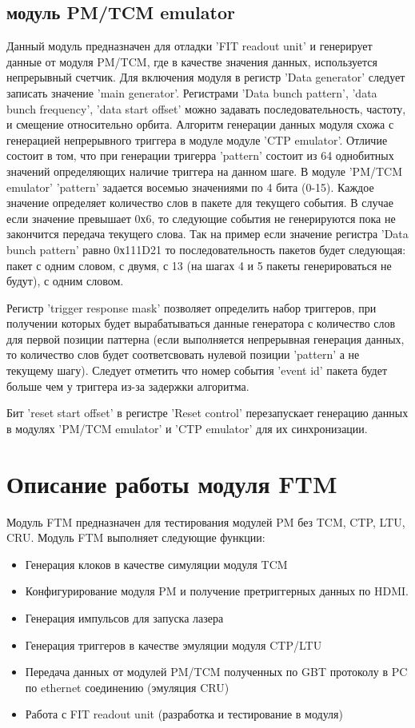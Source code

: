 \documentclass{article}
\begin{document}
\subsection{модуль PM/TCM emulator}
Данный модуль предназначен для отладки 'FIT readout unit' и генерирует данные от модуля PM/TCM, где в качестве значения данных, используется непрерывный счетчик. Для включения модуля в регистр 'Data generator' следует записать значение 'main generator'. Регистрами 'Data bunch pattern', 'data bunch frequency', 'data start offset' можно задавать последовательность, частоту, и смещение относительно орбита. Алгоритм генерации данных модуля схожа с генерацией непрерывного триггера в модуле модуле 'CTP emulator'. Отличие состоит в том, что при генерации тригерра 'pattern' состоит из 64 однобитных значений определяющих наличие триггера на данном шаге. В модуле 'PM/TCM emulator' 'pattern' задается восемью значениями по 4 бита (0-15). Каждое значение определяет количество слов в пакете для текущего события. В случае если значение превышает 0х6, то следующие события не генерируются пока не закончится передача текущего слова. Так на пример если значение регистра 'Data bunch pattern' равно 0х111D21 то последовательность пакетов будет следующая: пакет с одним словом, с двумя, с 13 (на шагах 4 и 5 пакеты генерироваться не будут), с одним словом.

Регистр 'trigger response mask' позволяет определить набор триггеров, при получении которых будет вырабатываться данные генератора с количество слов для первой позиции паттерна (если выполняется непрерывная генерация данных, то количество слов будет соответсвовать нулевой позиции 'pattern' а не текущему шагу). Следует отметить что номер события 'event id' пакета будет больше чем у триггера из-за задержки алгоритма. 

Бит 'reset start offset' в регистре 'Reset control' перезапускает генерацию данных в модулях 'PM/TCM emulator' и 'CTP emulator' для их синхронизации.

\section{Описание работы модуля FTM}

Модуль FTM предназначен для тестирования модулей PM без TCM, CTP, LTU, CRU. Модуль FTM выполняет следующие функции:
\begin{itemize}

\item Генерация клоков в качестве симуляции модуля TCM
\item Конфигурирование модуля PM и получение претриггерных данных по HDMI.
\item Генерация импульсов для запуска лазера
\item Генерация триггеров в качестве эмуляции модуля CTP/LTU
\item Передача данных от модулей PM/TCM полученных по GBT протоколу в PC по ethernet соединению (эмуляция CRU)
\item Работа с FIT readout unit (разработка и тестирование в модуля)
\end{itemize}
\end{document}
